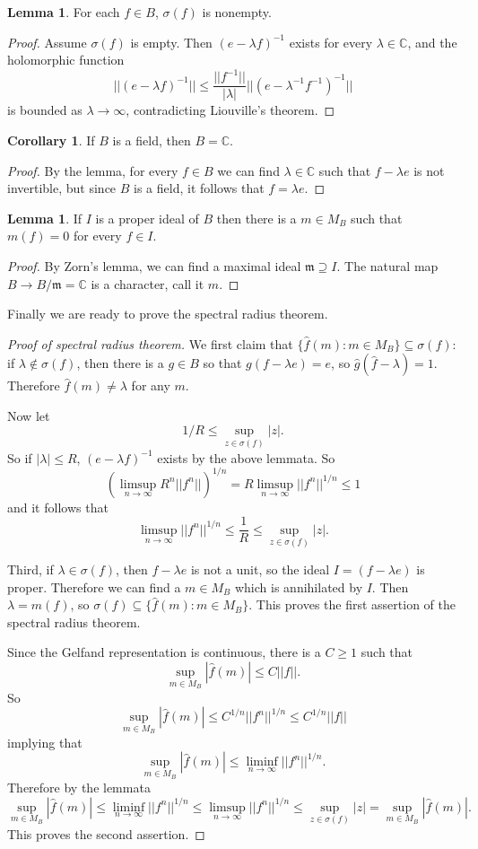 \documentclass[12pt]{report}
\newcommand{\CC}{\mathbb{C}}
\theoremstyle{definition}
\newtheorem{lemma}[theorem]{Lemma}
\newtheorem{corollary}[theorem]{Corollary}
\begin{document}
\begin{lemma}
    For each $f \in B$, $\sigma(f)$ is nonempty.
\end{lemma}
\begin{proof}
    Assume $\sigma(f)$ is empty. Then $(e - \lambda f)^{-1}$ exists for every $\lambda \in \CC$, and the holomorphic function
    $$||(e - \lambda f)^{-1}|| \leq \frac{||f^{-1}||}{|\lambda|}||(e - \lambda^{-1}f^{-1})^{-1}||$$
    is bounded as $\lambda\to \infty$, contradicting Liouville's theorem.
\end{proof}
\begin{corollary}
    If $B$ is a field, then $B = \CC$.
\end{corollary}
\begin{proof}
    By the lemma, for every $f \in B$ we can find $\lambda \in \CC$ such that $f - \lambda e$ is not invertible, but since $B$ is a field, it follows that $f = \lambda e$.
\end{proof}
\begin{lemma}
    If $I$ is a proper ideal of $B$ then there is a $m \in M_B$ such that $m(f) = 0$ for every $f \in I$.
\end{lemma}
\begin{proof}
    By Zorn's lemma, we can find a maximal ideal $\mathfrak m \supseteq I$. The natural map $B \to B/\mathfrak m = \CC$ is a character, call it $m$.
\end{proof}
    Finally we are ready to prove the spectral radius theorem.
\begin{proof}[Proof of spectral radius theorem]
    We first claim that $\{\hat f(m): m \in M_B\} \subseteq \sigma(f)$: if $\lambda \notin \sigma(f)$, then there is a $g \in B$ so that $g(f - \lambda e) = e$, so $\hat g(\hat f - \lambda) = 1$. Therefore $\hat f(m) \neq \lambda$ for any $m$.

    Now let
    $$1/R \leq \sup_{z \in \sigma(f)} |z|.$$
    So if $|\lambda| \leq R$, $(e-\lambda f)^{-1}$ exists by the above lemmata. So
    $$\left(\limsup_{n \to \infty} R^n||f^n||\right)^{1/n} =  R\limsup_{n \to \infty}||f^n||^{1/n} \leq 1$$
    and it follows that
    $$\limsup_{n \to \infty} ||f^n||^{1/n} \leq \frac{1}{R} \leq \sup_{z \in \sigma(f)} |z|.$$

    Third, if $\lambda \in \sigma(f)$, then $f - \lambda e$ is not a unit, so the ideal $I = (f - \lambda e)$ is proper. Therefore we can find a $m \in M_B$ which is annihilated by $I$. Then $\lambda = m(f)$, so $\sigma(f) \subseteq \{\hat f(m): m \in M_B\}$. This proves the first assertion of the spectral radius theorem.

    Since the Gelfand representation is continuous, there is a $C \geq 1$ such that
    $$\sup_{m \in M_B} |\hat f(m)| \leq C||f||.$$
    So
    $$\sup_{m \in M_B} |\hat f(m)| \leq C^{1/n} ||f^n||^{1/n} \leq C^{1/n}||f||$$
    implying that
    $$\sup_{m \in M_B} |\hat f(m)| \leq \liminf_{n \to \infty} ||f^n||^{1/n}.$$
    Therefore by the lemmata
    $$\sup_{m \in M_B} |\hat f(m)| \leq \liminf_{n \to \infty} ||f^n||^{1/n} \leq \limsup_{n \to \infty} ||f^n||^{1/n} \leq \sup_{z \in \sigma(f)} |z| = \sup_{m \in M_B} |\hat f(m)|.$$
    This proves the second assertion.
\end{proof}
\end{document}

